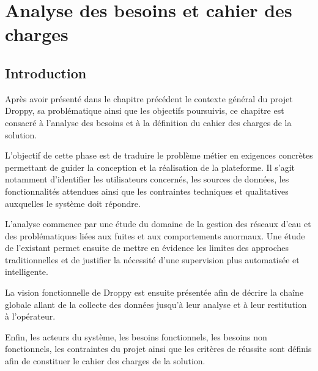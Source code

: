 
\chapter{Analyse des besoins et cahier des charges}


\section{Introduction}

Après avoir présenté dans le chapitre précédent le contexte général du
projet Droppy, sa problématique ainsi que les objectifs poursuivis, ce
chapitre est consacré à l'analyse des besoins et à la définition du cahier
des charges de la solution.

L'objectif de cette phase est de traduire le problème métier en exigences
concrètes permettant de guider la conception et la réalisation de la
plateforme. Il s'agit notamment d'identifier les utilisateurs concernés,
les sources de données, les fonctionnalités attendues ainsi que les
contraintes techniques et qualitatives auxquelles le système doit répondre.

L'analyse commence par une étude du domaine de la gestion des réseaux d'eau
et des problématiques liées aux fuites et aux comportements anormaux. Une
étude de l'existant permet ensuite de mettre en évidence les limites des
approches traditionnelles et de justifier la nécessité d'une supervision
plus automatisée et intelligente.

La vision fonctionnelle de Droppy est ensuite présentée afin de décrire la
chaîne globale allant de la collecte des données jusqu'à leur analyse et à
leur restitution à l'opérateur.

Enfin, les acteurs du système, les besoins fonctionnels, les besoins non
fonctionnels, les contraintes du projet ainsi que les critères de réussite
sont définis afin de constituer le cahier des charges de la solution.


